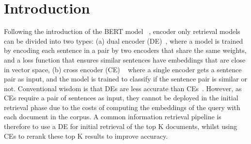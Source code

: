 \section{Introduction}
Following the introduction of the BERT model ~\cite{devlin2018bert}, encoder only retrieval models can be divided into two types: (a) dual encoder (DE)~\cite{lu2020twinbertdistillingknowledgetwinstructured}, where a model is trained by encoding each sentence in a pair by two encoders that share the same weights, and a loss function that ensures similar sentences have embeddings that are close in vector space, (b) cross encoder (CE) ~\cite{nogueira2020passagererankingbert, gao2021rethinktrainingbertrerankers} where a single encoder gets a sentence pair as input, and the model is trained to classify if the sentence pair is similar or not. Conventional wisdom is that DEs are less accurate than CEs~\cite{Hofstatter2020}. However, as CEs require a pair of sentences as input, they cannot be deployed in the initial retrieval phase due to the costs of computing the embeddings of the query with each document in the corpus.
A common information retrieval pipeline is therefore to use a DE for initial retrieval of the top K documents, whilst using CEs to rerank these top K results to improve accuracy. 

